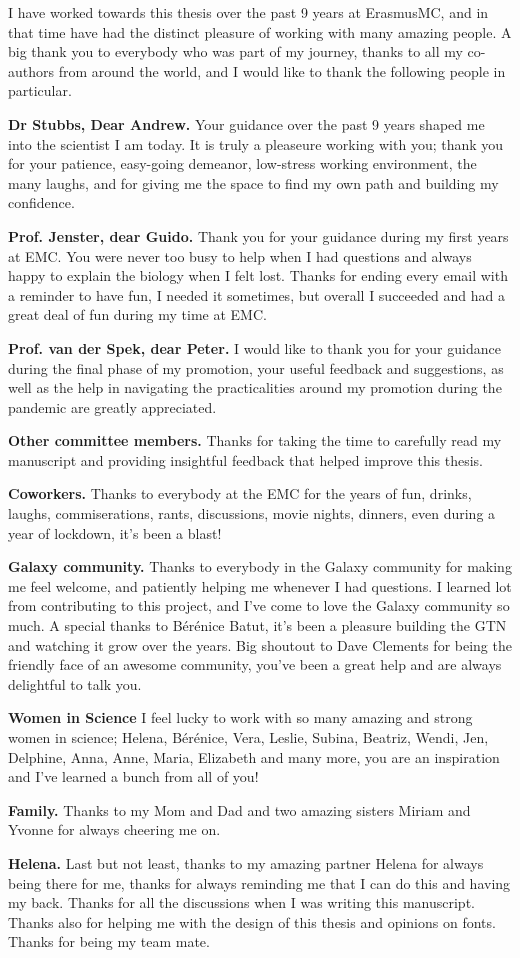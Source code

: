 
 I have worked towards this thesis over the past 9 years at ErasmusMC, and in that time have had the distinct pleasure of working with many amazing people. A big thank you to everybody who was part of my journey, thanks to all my co-authors from around the world, and I would like to thank the following people in particular.

\textbf{Dr Stubbs, Dear Andrew.} Your guidance over the past 9 years shaped me into the scientist I am today. It is truly a pleaseure working with you; thank you for your patience, easy-going demeanor, low-stress working environment, the many laughs, and for giving me the space to find my own path and building my confidence.

\textbf{Prof. Jenster, dear Guido.} Thank you for your guidance during my first years at EMC. You were never too busy to help when I had questions and always happy to explain the biology when I felt lost. Thanks for ending every email with a reminder to have fun, I needed it sometimes, but overall I succeeded and had a great deal of fun during my time at EMC.

\textbf{Prof. van der Spek, dear Peter.} I would like to thank you for your guidance during the final phase of my promotion, your useful feedback and suggestions, as well as the help in navigating the practicalities around my promotion during the pandemic are greatly appreciated.

\textbf{Other committee members.} Thanks for taking the time to carefully read my manuscript and providing insightful feedback that helped improve this thesis.

\textbf{Coworkers.} Thanks to everybody at the EMC for the years of fun, drinks, laughs, commiserations, rants, discussions, movie nights, dinners, even during a year of lockdown, it's been a blast!

\textbf{Galaxy community.} Thanks to everybody in the Galaxy community for making me feel welcome, and patiently helping me whenever I had questions. I learned lot from contributing to this project, and I've come to love the Galaxy community so much. A special thanks to Bérénice Batut, it's been a pleasure building the GTN and watching it grow over the years. Big shoutout to Dave Clements for being the friendly face of an awesome community, you've been a great help and are always delightful to talk you.

\textbf{Women in Science} I feel lucky to work with so many amazing and strong women in science; Helena, Bérénice, Vera, Leslie, Subina, Beatriz, Wendi, Jen, Delphine, Anna, Anne, Maria, Elizabeth and many more, you are an inspiration and I've learned a bunch from all of you!

\textbf{Family.} Thanks to my Mom and Dad and two amazing sisters Miriam and Yvonne for always cheering me on.

\textbf{Helena.} Last but not least, thanks to my amazing partner Helena for always being there for me, thanks for always reminding me that I can do this and having my back. Thanks for all the discussions when I was writing this manuscript. Thanks also for helping me with the design of this thesis and opinions on fonts. Thanks for being my team mate.
